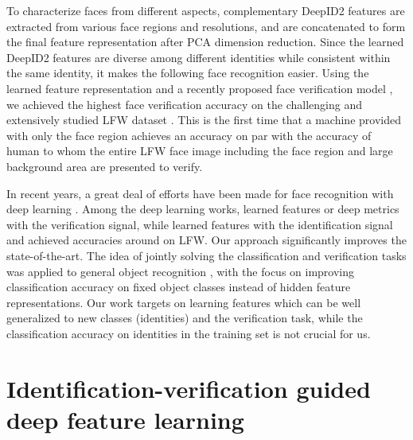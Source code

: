 \documentclass{article} \usepackage{nips14submit_e,times}
\begin{document}
To characterize faces from different aspects, complementary DeepID2 features are extracted from various face regions and resolutions, and are concatenated to form the final feature representation after PCA dimension reduction. Since the learned DeepID2 features are diverse among different identities while consistent within the same identity, it makes the following face recognition easier. Using the learned feature representation and a recently proposed face verification model \cite{chen2012}, we achieved the highest  face verification accuracy on the challenging and extensively studied LFW dataset \cite{huang2007}. This is the first time that a machine provided with only the face region achieves an accuracy on par with the  accuracy of human to whom the entire LFW face image including the face region and large background area are presented to verify.

In recent years, a great deal of efforts have been made for face recognition with deep learning \cite{chopra2005,huang2012,sun2013b,zhu2013,hu2014,taigman2014,sun2014}. Among the deep learning works, \cite{chopra2005,sun2013b,hu2014} learned features or deep metrics with the verification signal, while \cite{taigman2014,sun2014} learned features with the identification signal and achieved accuracies around  on LFW. Our approach significantly improves the state-of-the-art. The idea of jointly solving the classification and verification tasks was applied to general object recognition \cite{mobahi2009}, with the focus on improving classification accuracy on fixed object classes instead of hidden feature representations. Our work targets on learning features which can be well generalized to new classes (identities) and the verification task, while the classification accuracy on identities in the training set is not crucial for us.


\section{Identification-verification guided deep feature learning}
\label{sec:deepiv}
\end{document}
